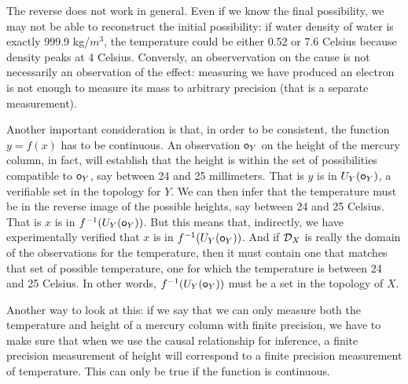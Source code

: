 \documentclass[11pt,letterpaper,fleqn]{memoir} %
\begin{document}
The reverse does not work in general. Even if we know the final possibility, we may not be able to reconstruct the initial possibility: if water density of water is exactly 999.9 kg/$m^3$, the temperature could be either 0.52 or 7.6 Celsius because density peaks at 4 Celsius. Conversly, an observervation on the cause is not necessarily an observation of the effect: measuring we have produced an electron is not enough to measure its mass to arbitrary precision (that is a separate measurement).

Another important consideration is that, in order to be consistent, the function $y=f(x)$ has to be continuous. An observation $\mathsf{o}_Y$ on the height of the mercury column, in fact, will establish that the height is within the set of possibilities compatible to $\mathsf{o}_Y$, say between 24 and 25 millimeters. That is $y$ is in $U_Y(\mathsf{o}_Y)$, a verifiable set in the topology for $Y$. We can then infer that the temperature must be in the reverse image of the possible heights, say between 24 and 25 Celsius. That is $x$ is in $f^{-1}(U_Y(\mathsf{o}_Y))$. But this means that, indirectly, we have experimentally verified that $x$ is in $f^{-1}(U_Y(\mathsf{o}_Y))$. And if $\mathcal{D}_X$ is really the domain of the observations for the temperature, then it must contain one that matches that set of possible temperature, one for which the temperature is between 24 and 25 Celsius. In other words, $f^{-1}(U_Y(\mathsf{o}_Y))$ must be a set in the topology of $X$.

Another way to look at this: if we say that we can only measure both the temperature and height of a mercury column with finite precision, we have to make sure that when we use the causal relationship for inference, a finite precision measurement of height will correspond to a finite precision measurement of temperature. This can only be true if the function is continuous.
\end{document}
